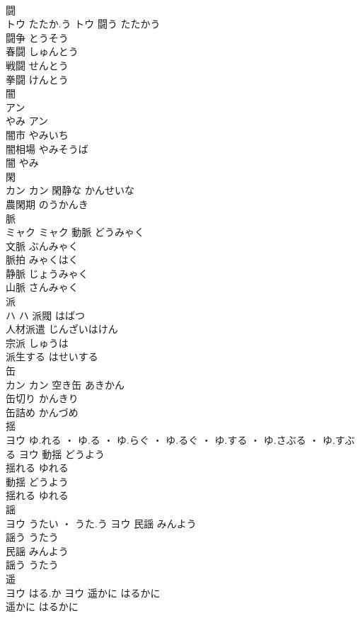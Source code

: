 \documentclass[8pt]{extreport}
\begin{document}
\begin{CJK}{UTF8}{min}
\\	闘	
\\	トウ	たたか.う	トウ	闘う	たたかう	
\\	闘争	とうそう	
\\	春闘	しゅんとう	
\\	戦闘	せんとう	
\\	拳闘	けんとう	
\\	闇	
\\	アン
\\	やみ	アン
\\	闇市	やみいち	
\\	闇相場	やみそうば	
\\	闇	やみ	
\\	閑	
\\	カン		カン	閑静な	かんせいな	
\\	農閑期	のうかんき	
\\	脈	
\\	ミャク		ミャク	動脈	どうみゃく	
\\	文脈	ぶんみゃく	
\\	脈拍	みゃくはく	
\\	静脈	じょうみゃく	
\\	山脈	さんみゃく	
\\	派	
\\	ハ		ハ	派閥	はばつ	
\\	人材派遣	じんざいはけん	
\\	宗派	しゅうは	
\\	派生する	はせいする	
\\	缶	
\\	カン		カン	空き缶	あきかん	
\\	缶切り	かんきり	
\\	缶詰め	かんづめ	
\\	揺	
\\	ヨウ	ゆ.れる ・ ゆ.る ・ ゆ.らぐ ・ ゆ.るぐ ・ ゆ.する ・ ゆ.さぶる ・ ゆ.すぶる	ヨウ	動揺	どうよう	
\\	揺れる	ゆれる	
\\	動揺	どうよう	
\\	揺れる	ゆれる	
\\	謡	
\\	ヨウ	うたい ・ うた.う	ヨウ	民謡	みんよう	
\\	謡う	うたう	
\\	民謡	みんよう	
\\	謡う	うたう	
\\	遥	
\\	ヨウ	はる.か	ヨウ	遥かに	はるかに	
\\	遥かに	はるかに	

\end{CJK}
\end{document}
